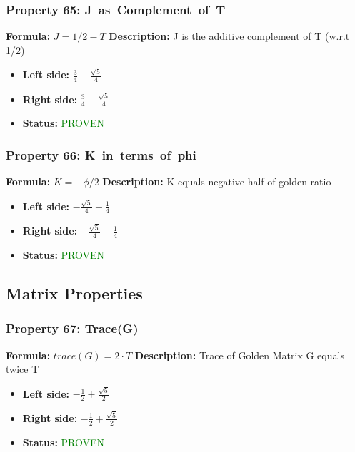 \subsubsection*{Property 65: J~as~Complement~of~T}
\textbf{Formula:} $J = 1/2 - T$
\textbf{Description:} J is the additive complement of T (w.r.t 1/2)

\begin{itemize}
\item \textbf{Left side:} $\frac{3}{4} - \frac{\sqrt{5}}{4}$
\item \textbf{Right side:} $\frac{3}{4} - \frac{\sqrt{5}}{4}$
\item \textbf{Status:} \textcolor{green}{PROVEN}
\end{itemize}

\subsubsection*{Property 66: K~in~terms~of~phi}
\textbf{Formula:} $K = -\phi/2$
\textbf{Description:} K equals negative half of golden ratio

\begin{itemize}
\item \textbf{Left side:} $- \frac{\sqrt{5}}{4} - \frac{1}{4}$
\item \textbf{Right side:} $- \frac{\sqrt{5}}{4} - \frac{1}{4}$
\item \textbf{Status:} \textcolor{green}{PROVEN}
\end{itemize}


\subsection{Matrix Properties}

\subsubsection*{Property 67: Trace(G)}
\textbf{Formula:} $trace(G) = 2 \cdot T$
\textbf{Description:} Trace of Golden Matrix G equals twice T

\begin{itemize}
\item \textbf{Left side:} $- \frac{1}{2} + \frac{\sqrt{5}}{2}$
\item \textbf{Right side:} $- \frac{1}{2} + \frac{\sqrt{5}}{2}$
\item \textbf{Status:} \textcolor{green}{PROVEN}
\end{itemize}

